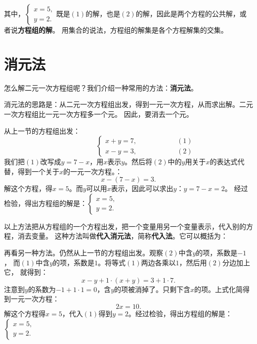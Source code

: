 \documentclass[12pt,UTF8,fontset=none]{ctexbook}
\begin{document}
其中，$\left\{ \begin{array}{c}
    x = 5, \\
    y = 2.
\end{array}\right.$既是$(1)$的解，也是$(2)$的解，因此是两个方程的公共解，或者说\textbf{方程组的解}。
用集合的说法，方程组的解集是各个方程解集的交集。

\section{消元法}
怎么解二元一次方程组呢？我们介绍一种常用的方法：\textbf{消元法}。

消元法的思路是：从二元一次方程组出发，得到一元一次方程，从而求出解。二元一次方程组比一元一次方程多一个元。
因此，要消去一个元。

从上一节的方程组出发：
$$ \quad \quad \quad \quad \quad\left\{
\begin{array}{cr}
     x + y = 7, & \quad \quad \quad \quad \quad (1) \\
     x - y = 3, & \quad \quad \quad \quad \quad (2)
\end{array}\right.
$$
我们把$(1)$改写成$y = 7 - x$，用$x$表示$y$。然后将$(2)$中的$y$用关于$x$的表达式代替，得到一个关于$x$的一元一次方程。：
$$ x - (7 - x) = 3.$$
解这个方程，得$x = 5$。而$y$可以用$x$表示，因此可以求出$y$：$y = 7 - x = 2$。
经过检验，得出方程组的解是：$\left\{ \begin{array}{c}
    x = 5, \\
    y = 2.
\end{array}\right.$

以上方法把从方程组的一个方程出发，把一个变量用另一个变量表示，代入别的方程，消去变量。
这种方法叫做\textbf{代入消元法}，简称\textbf{代入法}。它可以概括为：
\begin{center}
\end{center}

再看另一种方法。仍然从上一节的方程组出发。观察$(2)$中含$y$的项，系数是$-1$，
而$(1)$中含$y$的项，系数是$1$。将等式$(1)$两边各乘以$1$，然后用$(2)$分边加上它，
就得到：
$$ x - y + 1 \cdot (x + y) = 3 + 1 \cdot 7.$$
注意到$y$的系数为$-1 + 1 \cdot 1 = 0$，含$y$的项被消掉了。只剩下含$x$的项。上式化简得到一元一次方程：
$$ 2x = 10.$$
解这个方程得$x = 5$，代入$(1)$得到$y = 2$。经过检验，得出方程组的解是：$\left\{ \begin{array}{c}
    x = 5, \\
    y = 2.
\end{array}\right.$
\end{document}
